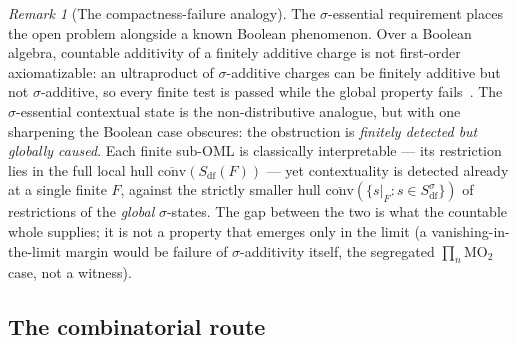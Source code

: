 \documentclass[11pt,reqno]{amsart}
\theoremstyle{plain}
\theoremstyle{definition}
\theoremstyle{remark}
\newtheorem{remark}[theorem]{Remark}
\begin{document}
\begin{remark}[The compactness-failure analogy]\label{rem:ce}
The $\sigma$-essential requirement places the open problem alongside a known
Boolean phenomenon. Over a Boolean algebra, countable additivity of a finitely
additive charge is not first-order axiomatizable: an ultraproduct of $\sigma$-additive
charges can be finitely additive but not $\sigma$-additive, so every finite test is
passed while the global property fails~\cite{mahon2025}. The $\sigma$-essential
contextual state is the non-distributive analogue, but with one sharpening the Boolean
case obscures: the obstruction is \emph{finitely detected but globally caused}. Each
finite sub-OML is classically interpretable --- its restriction lies in the full local
hull $\overline{\mathrm{conv}}(S_{\mathrm{df}}(F))$ --- yet contextuality is detected
already at a single finite $F$, against the strictly smaller hull
$\overline{\mathrm{conv}}(\{s|_F:s\in S_{\mathrm{df}}^\sigma\})$ of restrictions of the
\emph{global} $\sigma$-states. The gap between the two is what the countable whole
supplies; it is not a property that emerges only in the limit (a vanishing-in-the-limit
margin would be failure of $\sigma$-additivity itself, the segregated $\prod_n\mathrm
{MO}_2$ case, not a witness).
\end{remark}

\subsection{The combinatorial route}
\label{sec:why-sigma}
\end{document}
